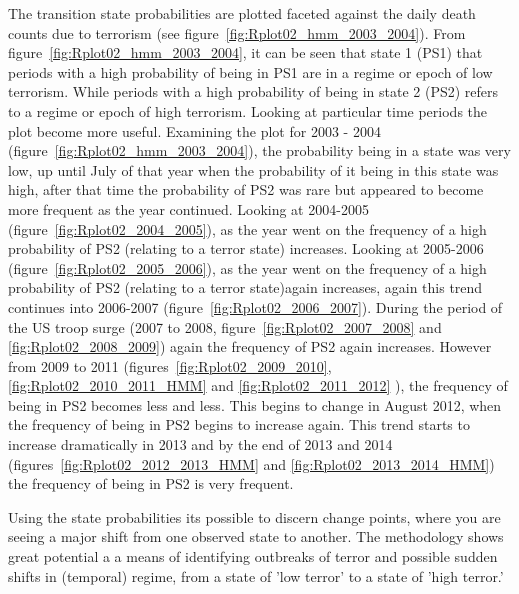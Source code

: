 The transition state probabilities are plotted faceted against the daily death counts due to terrorism (see figure~\ref{fig:Rplot02_hmm_2003_2004}). From figure~\ref{fig:Rplot02_hmm_2003_2004}, it can be seen that state 1 (PS1) that periods with a high probability of being in PS1 are in a regime or epoch of low terrorism. While periods with a high probability of being in state 2 (PS2) refers to a  regime or epoch of high terrorism. Looking at particular time periods the plot become more useful. Examining the plot for 2003 - 2004 (figure~\ref{fig:Rplot02_hmm_2003_2004}), the probability being in a state was very low, up until July of that year when the probability of it being in this state was high, after that time the probability of PS2 was rare but appeared to become more frequent as the year continued. Looking at 2004-2005 (figure~\ref{fig:Rplot02_2004_2005}), as the year went on the frequency of a high probability of PS2 (relating to a terror state) increases. Looking at 2005-2006 (figure~\ref{fig:Rplot02_2005_2006}), as the year went on the frequency of a high probability of PS2 (relating to a terror state)again increases, again this trend continues into 2006-2007 (figure~\ref{fig:Rplot02_2006_2007}). During the period of the US troop surge (2007 to 2008, figure~\ref{fig:Rplot02_2007_2008} and \ref{fig:Rplot02_2008_2009}) again the frequency of PS2 again increases. However  from 2009 to 2011 (figures~\ref{fig:Rplot02_2009_2010}, \ref{fig:Rplot02_2010_2011_HMM} and \ref{fig:Rplot02_2011_2012} ), the frequency of being in PS2 becomes less and less. This begins to change in August 2012, when the frequency of being in PS2 begins to increase again. This trend starts to increase dramatically  in 2013 and by the end of 2013 and 2014 (figures~\ref{fig:Rplot02_2012_2013_HMM} and \ref{fig:Rplot02_2013_2014_HMM})  the frequency of being in PS2 is very frequent.  

Using the state probabilities its possible to discern change points, where you are seeing a major shift from one observed state to another. The methodology shows great potential a a means of identifying outbreaks of terror and possible sudden shifts in (temporal) regime, from a state of 'low terror' to a state of 'high terror.'

